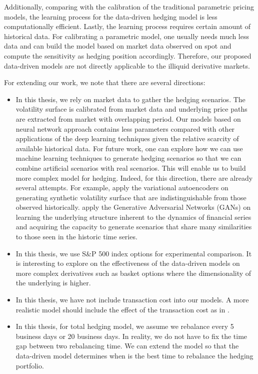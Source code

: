 \documentclass[letterpaper,12pt,titlepage,oneside,final]{book}
\numberwithin{equation}{section}
\theoremstyle{definition}
\begin{document}
Additionally, comparing with the calibration of the traditional parametric pricing models, the learning process for the data-driven hedging model is less computationally efficient. Lastly, the learning process requires certain amount of historical data. For calibrating a parametric model, one usually needs much less data and  can  build the model based on market data observed on spot and compute the sensitivity as hedging position accordingly.  Therefore, our proposed data-driven models are not directly applicable to the illiquid derivative markets.  



For extending our work, we note that there are several directions:
\begin{itemize}
	\item In this thesis, we rely on market data to gather the hedging scenarios.  The volatility surface is calibrated from market data and underlying price paths are extracted from market with overlapping period. Our models based on neural network approach contains less parameters compared with other applications of the deep learning techniques given the relative scarcity of available historical data. 
	For future work, one can explore how we can use machine learning techniques to generate hedging scenarios so that we can combine artificial scenarios with real scenarios. This will enable us to build more complex model for hedging.
	Indeed, for this direction, there are already several attempts. For example, \citet{bergeron2021variational} apply the variational autoencoders \cite{kingma2013auto} on generating synthetic volatility surface  that are indistinguishable from those observed historically. \citet{pardo2020mitigating} apply the  Generative Adversarial Networks (GANs) \cite{goodfellow2014generative} on learning  the underlying structure inherent to the dynamics of financial series and acquiring the capacity to generate scenarios that share many similarities to those seen in the historic  time series.  
	\item In this thesis, we use S\&P 500 index options for experimental comparison. It is interesting to explore on the effectiveness of the data-driven models on more complex derivatives such as basket options where the dimensionality of the underlying is higher. 
	\item In this thesis, we have not include transaction cost into our models. A more realistic model should include the effect of the transaction cost as in \cite{buehler2019deep}. 
	\item  In this thesis, for total hedging  model, we assume we rebalance every 5 business days or 20 business days. In reality, we do not have to fix the time gap between two rebalancing time. We can extend the model so that the data-driven model determines when is the best time to rebalance the hedging portfolio. 
\end{itemize}
\end{document}

